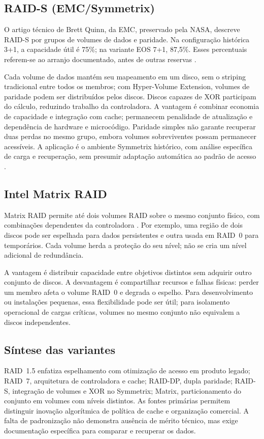 \documentclass[titlepage]{article}
\begin{document}
\subsection{RAID-S (EMC/Symmetrix)}
O artigo técnico de Brett Quinn, da EMC, preservado pela NASA, descreve RAID-S por grupos de volumes de dados e paridade. Na configuração histórica 3+1, a capacidade útil é 75\%; na variante EOS 7+1, 87,5\%. Esses percentuais referem-se ao arranjo documentado, antes de outras reservas \cite{raid_s_nasa}.

Cada volume de dados mantém seu mapeamento em um disco, sem o striping tradicional entre todos os membros; com Hyper-Volume Extension, volumes de paridade podem ser distribuídos pelos discos. Discos capazes de XOR participam do cálculo, reduzindo trabalho da controladora. A vantagem é combinar economia de capacidade e integração com cache; permanecem penalidade de atualização e dependência de hardware e microcódigo. Paridade simples não garante recuperar duas perdas no mesmo grupo, embora volumes sobreviventes possam permanecer acessíveis. A aplicação é o ambiente Symmetrix histórico, com análise específica de carga e recuperação, sem presumir adaptação automática ao padrão de acesso \cite{raid_s_nasa}.

\subsection{Intel Matrix RAID}
Matrix RAID permite até dois volumes RAID sobre o mesmo conjunto físico, com combinações dependentes da controladora \cite{intel_matrix}. Por exemplo, uma região de dois discos pode ser espelhada para dados persistentes e outra usada em RAID~0 para temporários. Cada volume herda a proteção do seu nível; não se cria um nível adicional de redundância.

A vantagem é distribuir capacidade entre objetivos distintos sem adquirir outro conjunto de discos. A desvantagem é compartilhar recursos e falhas físicas: perder um membro afeta o volume RAID~0 e degrada o espelho. Para desenvolvimento ou instalações pequenas, essa flexibilidade pode ser útil; para isolamento operacional de cargas críticas, volumes no mesmo conjunto não equivalem a discos independentes.

\subsection{Síntese das variantes}
RAID~1.5 enfatiza espelhamento com otimização de acesso em produto legado; RAID~7, arquitetura de controladora e cache; RAID-DP, dupla paridade; RAID-S, integração de volumes e XOR no Symmetrix; Matrix, particionamento do conjunto em volumes com níveis distintos. As fontes primárias permitem distinguir inovação algorítmica de política de cache e organização comercial. A falta de padronização não demonstra ausência de mérito técnico, mas exige documentação específica para comparar e recuperar os dados.
\end{document}
